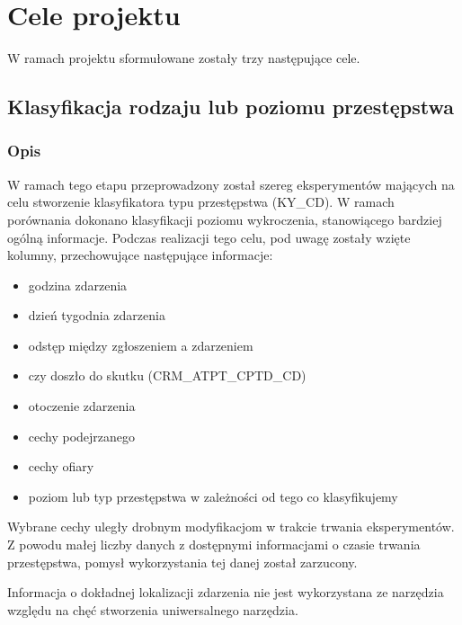 \documentclass{classrep}
\begin{document}
    \section{Cele projektu} \label{project_goals} {
        W ramach projektu sformułowane zostały trzy następujące cele.

        \subsection{Klasyfikacja rodzaju lub poziomu przestępstwa}
        \label{project_goal_1} {

            \subsubsection{Opis} {
                W ramach tego etapu przeprowadzony został szereg eksperymentów mających
                na celu stworzenie klasyfikatora typu przestępstwa (KY\_CD). W ramach porównania dokonano klasyfikacji poziomu wykroczenia,
                stanowiącego bardziej ogólną informacje. Podczas realizacji tego celu, pod uwagę zostały wzięte kolumny, przechowujące następujące informacje:
                \begin{itemize}
                    \item godzina zdarzenia
                    \item dzień tygodnia zdarzenia
                    \item odstęp między zgłoszeniem a zdarzeniem
                    \item czy doszło do skutku (CRM\_ATPT\_CPTD\_CD)
                    \item otoczenie zdarzenia
                    \item cechy podejrzanego
                    \item cechy ofiary
                    \item poziom lub typ przestępstwa w zależności od tego co klasyfikujemy
                \end{itemize}

                Wybrane cechy uległy drobnym modyfikacjom w trakcie trwania
                eksperymentów. 
                Z powodu małej liczby danych z dostępnymi informacjami o czasie trwania przestępstwa, pomysł wykorzystania tej danej został zarzucony.

                Informacja o dokładnej lokalizacji zdarzenia nie jest wykorzystana ze
narzędzia                względu na chęć stworzenia uniwersalnego narzędzia.

}}}
\end{document}
